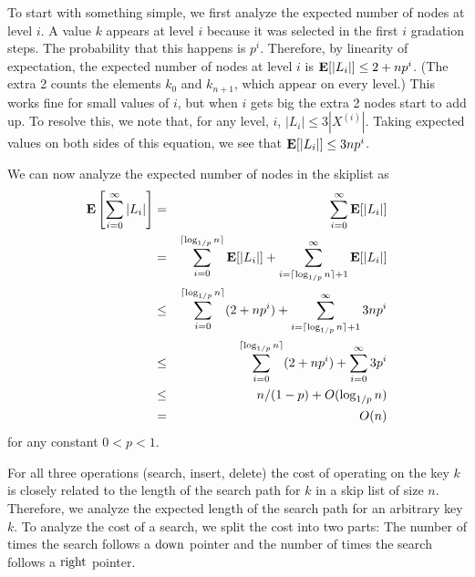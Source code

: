 To start with something simple, we first analyze the expected number of
nodes at level $i$.  A value $k$ appears at level $i$ because it was
selected in the first $i$ gradation steps.  The probability that this
happens is $p^i$.  Therefore, by linearity of expectation, the expected
number of nodes at level $i$ is $\mathbf{E}[|L_i|]\le 2+np^i$. (The extra 2
counts the elements $k_0$ and $k_{n+1}$, which appear on every level.)
This works fine for small values of $i$, but when $i$ gets big the extra
2 nodes start to add up.  To resolve this, we note that, for any level,
$i$, $|L_i| \le 3 |X^{(i)}|$.  Taking expected values on both sides of
this equation, we see that $\mathbf{E}[|L_i|]\le 3np^i$.

We can now analyze the expected number of nodes in the skiplist as
\begin{eqnarray*}
   \mathbf{E}\left[\sum_{i=0}^\infty |L_i|\right]
   & = & \sum_{i=0}^\infty \mathbf{E}[|L_i|] \\
   & = & \sum_{i=0}^{\lceil\log_{1/p}n\rceil} \mathbf{E}[|L_i|] 
     + \sum_{i=\lceil\log_{1/p}n\rceil+1}^\infty \mathbf{E}[|L_i|] \\
   & \le & \sum_{i=0}^{\lceil\log_{1/p}n\rceil}(2+np^i)
     + \sum_{i=\lceil\log_{1/p}n\rceil+1}^\infty 3np^i \\
   & \le & \sum_{i=0}^{\lceil\log_{1/p}n\rceil}(2+np^i)
     + \sum_{i=0}^\infty 3p^i \\
   & \le & n/(1-p) + O(\log_{1/p} n) \\
   & = & O(n) 
\end{eqnarray*}
for any constant $0 < p < 1$.

For all three operations (search, insert, delete) the cost of
operating on the key $k$ is closely related to the length of the
search path for $k$ in a skip list of size $n$.  Therefore, we analyze
the expected length of the search path for an arbitrary key $k$.  
To analyze the cost of a search, we split the cost into two parts: The
number of times the search follows a $\mathrm{down}$ pointer and the number of
times the search follows a $\mathrm{right}$ pointer.


